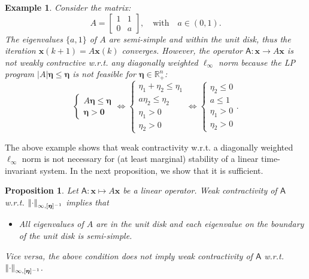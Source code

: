 \documentclass[journal,twoside,web]{ieeecolor}
\makeatletter
\newcommand{\abs}[1]{{\left\vert #1 \right\vert}}
\newcommand{\norm}[1]{{\left\vert\kern-0.25ex\left\vert #1\right\vert\kern-0.25ex\right\vert}}
\newcommand{\rea }{\mathbb{R}}
\newcommand{\xb}{\boldsymbol{x}}
\newcommand{\etab}{\boldsymbol{\eta}}
\newcommand{\As}{\mathsf{A}}
\newcommand{\bzero}{\boldsymbol{0}}
\newcommand{\diego}[1]{\color{red}{ @Diego: #1} \color{black}}
\newtheorem{prop}{Proposition}
\newtheorem{exmp}{Example}
\makeatother
\begin{document}
\begin{exmp}\label{exmp:counter}
Consider the matrix:
%
$$
A = \begin{bmatrix}
    1 & 1\\ 0 & a
\end{bmatrix}, \quad \text{with} \quad a\in(0,1).
$$
%
The eigenvalues $\{a,1\}$ of $A$ are semi-simple and within the unit disk, thus the iteration $\xb(k+1)=A\xb(k)$ converges. However, the operator $\As:\xb\rightarrow A\xb$ is not weakly contractive w.r.t. any diagonally weighted $\ell_{\infty}$ norm because the LP program $\abs{A}\etab \leq \etab$ is not feasible for $\etab\in\rea^n_+$:
%
$$
\begin{cases}
A\etab \leq \etab\\
\etab > \bzero
\end{cases} \Leftrightarrow \begin{cases}
    \eta_1 + \eta_2 \leq \eta_1\\
    a\eta_2 \leq \eta_2\\
    \eta_1 > 0\\
    \eta_2 > 0
\end{cases} \Leftrightarrow \begin{cases}
    \eta_2 \leq 0\\
    a \leq 1\\
    \eta_1 > 0\\
    \eta_2 > 0
\end{cases}.
$$
\end{exmp}

The above example shows that weak contractivity w.r.t. a diagonally weighted $\ell_{\infty}$ norm is not necessary for (at least marginal) stability of a linear time-invariant system. In the next proposition, we show that it is sufficient.

\begin{prop}\label{prop:suff}
Let ${\As:\xb\mapsto A\xb}$ be a linear operator. Weak contractivity of $\As$ w.r.t. $\norm{\cdot}_{\infty,[\etab]^{-1}}$ implies that
\begin{itemize}
    \item[($\star$)] All eigenvalues of $A$ are in the unit disk and each eigenvalue on the boundary of the unit disk is semi-simple.
\end{itemize} 
%
Vice versa, the above condition does not imply weak contractivity of $\As$ w.r.t. $\norm{\cdot}_{\infty,[\etab]^{-1}}$.
\end{prop}
    
\end{document}
